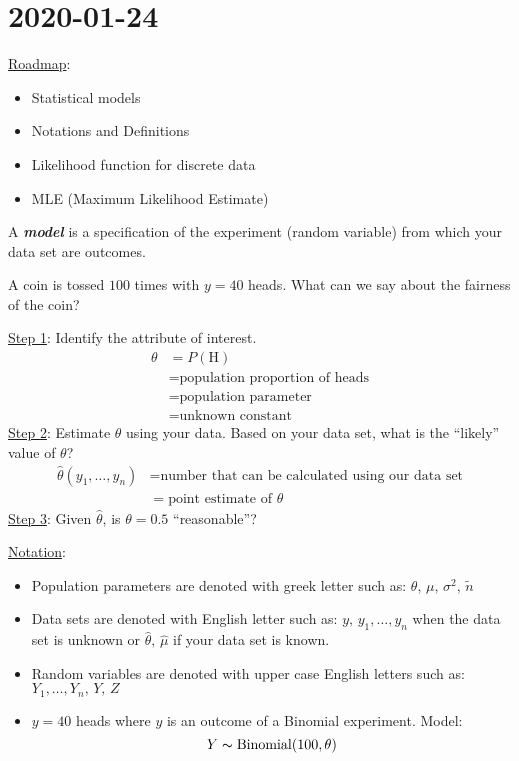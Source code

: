 \section{2020-01-24}
\underline{Roadmap}:
\begin{itemize}
    \item Statistical models
    \item Notations and Definitions
    \item Likelihood function for discrete data
    \item MLE (Maximum Likelihood Estimate)
\end{itemize}
\begin{defbox}
    \begin{definition}
        A \textbf{\emph{model}} is a specification of the experiment
        (random variable) from which your data set are outcomes.
    \end{definition}
\end{defbox}
A coin is tossed $ 100 $ times with $ y=40 $ heads. What can we say
about the fairness of the coin?

\underline{Step 1}: Identify the attribute of interest.
\begin{align*}
    \theta & =P(\text{H})                           \\
           & =\text{population proportion of heads} \\
           & =\text{population parameter}           \\
           & =\text{unknown constant}
\end{align*}
\underline{Step 2}: Estimate $ \theta $ using your data. Based on your data
set, what is the ``likely'' value of $ \theta $?
\begin{align*}
    \hat{\theta}(y_1,\ldots ,y_n) & =
    \text{number that can be calculated using our data set}           \\
                                  & =\text{point estimate of } \theta
\end{align*}
\underline{Step 3}: Given $ \hat{\theta} $, is $ \theta=0.5 $ ``reasonable''?

\underline{Notation}:
\begin{itemize}
    \item Population parameters are denoted with greek letter such as:
          $ \theta,\,\mu,\,\sigma^2,\,\tilde{n} $
    \item Data sets are denoted with English letter such as:
          $ y,\,y_1,\ldots ,y_n $ when the data set is unknown or
          $ \hat{\theta},\,\hat{\mu} $ if your data set is known.
    \item Random variables are denoted with upper case English letters such as:
          $ Y_1,\ldots ,Y_n,\,Y,\,Z $
    \item $ y=40 $ heads where $ y $ is an outcome of a Binomial experiment. Model:
          \[ Y \thicksim \operatorname{Binomial}(100,\theta) \]
\end{itemize}

